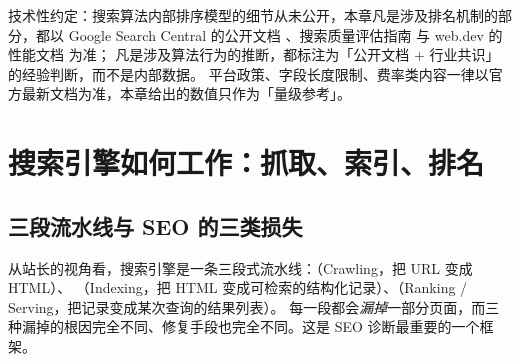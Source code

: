 技术性约定：搜索算法内部排序模型的细节从未公开，本章凡是涉及排名机制的部分，都以 Google Search Central 的公开文档
\cite{google2024seostarter}、搜索质量评估指南 \cite{google2024quality} 与 web.dev 的性能文档 \cite{google2024corewebvitals} 为准；
凡是涉及算法行为的推断，都标注为「公开文档 + 行业共识」的经验判断，而不是内部数据。
平台政策、字段长度限制、费率类内容一律以官方最新文档为准，本章给出的数值只作为「量级参考」。

\section{搜索引擎如何工作：抓取、索引、排名}
\label{sec:seo-crawl}

\subsection{三段流水线与 SEO 的三类损失}

从站长的视角看，搜索引擎是一条三段式流水线：（Crawling，把 URL 变成 HTML）、
（Indexing，把 HTML 变成可检索的结构化记录）、（Ranking / Serving，把记录变成某次查询的结果列表）。
每一段都会\emph{漏掉}一部分页面，而三种漏掉的根因完全不同、修复手段也完全不同。这是 SEO 诊断最重要的一个框架。

